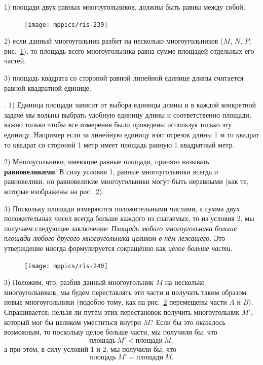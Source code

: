 \documentclass[twoside]{book}
\makeatletter
\newcommand{\rindex}[2][\imki@jobname]{%
  \index[#1]{\detokenize{#2}}%
}
\makeatother
\begin{document}
1) площади двух равных многоугольников, должны быть равны между собой; 

\begin{figure}
\centering
\texttt{[image: mppics/ris-239]}
\caption{}\label{1938/ris-239}
\end{figure}

2) если данный многоугольник разбит на несколько многоугольников ($M$, $N$, $P$, рис.~\ref{1938/ris-239}), то  площадь всего многоугольника равна сумме площадей отдельных его частей.

3) площадь квадрата со стороной равной линейной единице длины считается равной квадратной единице.


\smallskip
\mbox{.} 1) Единица площади зависит от выбора единицы длины и в каждой конкретной задаче мы вольны выбрать удобную единицу длины и соответственно площади, важно только чтобы все измерения были проведены используя только эту единицу.
Например если за линейную единицу взят отрезок длины 1 м то квадрат то квадрат со стороной 1 метр имеет площадь равную 1 квадратный метр.


2) Многоугольники, имеющие равные площади, принято называть \rindex{равновеликие многоугольники}\textbf{равновеликими}.
В силу условия 1, равные многоугольники всегда и равновелики, но равновеликие многоугольники могут быть неравными (как те, которые изображены на рис.~\ref{1938/ris-240}).

3) Поскольку площади измеряются положительными числами, а сумма двух положительных чисел всегда больше каждого из слагаемых, то из условия 2, мы получаем следующее заключение:
\emph{Площадь любого многоугольника больше площади любого другого многоугольника целиком в нём лежащего.}
Это утверждение иногда формулируется сокращённо как \emph{целое больше части}.

\begin{figure}
\centering
\texttt{[image: mppics/ris-240]}
\caption{}\label{1938/ris-240}
\end{figure}

3) Положим, что, разбив данный многоугольник $M$ на несколько многоугольников, мы будем переставлять эти части и получать таким образом новые многоугольники (подобно тому, как на рис.~\ref{1938/ris-240} перемещены части $A$ и $B$).
Спрашивается:
нельзя ли путём этих перестановок получить многоугольник $M'$, который мог бы целиком уместиться внутри $M$?
Если бы это оказалось возможным, то поскольку целое больше части, мы получили бы, что
\[\text{площадь}~M'<\text{площади}~M,\]
а при этом, в силу условий 1 и 2, мы получили бы, что
\[\text{площадь}~M'=\text{площади}~M.\]
\end{document}
